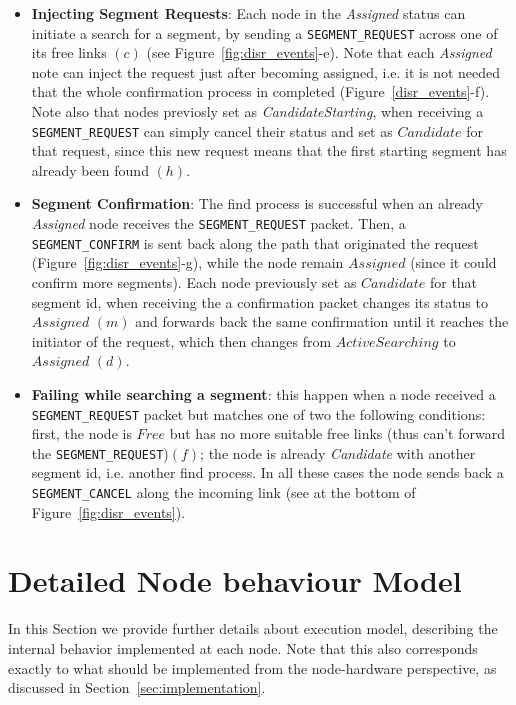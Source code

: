\begin{itemize}
\item{\textbf{Injecting Segment Requests}}: Each node in the
\emph{Assigned} status can initiate a search for a segment, by sending
a \texttt{SEGMENT\_REQUEST} across one of its free links $(c)$ (see
Figure~\ref{fig:disr_events}-e). 
Note that each \emph{Assigned} note can inject the request just after
becoming assigned, i.e. it is not needed that the whole confirmation
process in completed (Figure~\ref{disr_events}-f).
Note also that nodes previosly set as \emph{CandidateStarting}, when receiving 
a \texttt{SEGMENT\_REQUEST} can simply cancel their
status and set as $Candidate$ for that request, since this new
request means that the first starting segment has already been found $(h)$. 
\item{\textbf{Segment Confirmation}}: The find process is successful
when an already \emph{Assigned} node receives the
\texttt{SEGMENT\_REQUEST} packet. Then, a \texttt{SEGMENT\_CONFIRM} is
sent back along the path that originated the request
(Figure~\ref{fig:disr_events}-g), while the
node remain $Assigned$ (since it could confirm more segments). Each node
previously set as $Candidate$ for that segment id, when receiving the
a confirmation packet changes its status to $Assigned$ $(m)$ and forwards back
the same confirmation until it reaches the initiator of the request,
which then changes from $ActiveSearching$ to $Assigned$ $(d)$.

\item{\textbf{Failing while searching a segment}}: this happen when a node received a \texttt{SEGMENT\_REQUEST} packet but
matches one of two the following conditions: first, the node is $Free$ but has no
more suitable free links (thus can’t forward the
\texttt{SEGMENT\_REQUEST})$(f)$; the node
is already \emph{Candidate} with another segment id, i.e. another find
process.  In all these cases the node
sends back a \texttt{SEGMENT\_CANCEL} along the incoming link (see at
the bottom of Figure~\ref{fig:disr_events}).
\end{itemize}


\section{Detailed Node behaviour Model}
\label{sec:execution_model}

In this Section we provide further details about \disr{}
execution model, describing the internal behavior implemented at
each node. Note that this also corresponds exactly to what should be
implemented from the node-hardware perspective, as discussed in
Section~\ref{sec:implementation}.

